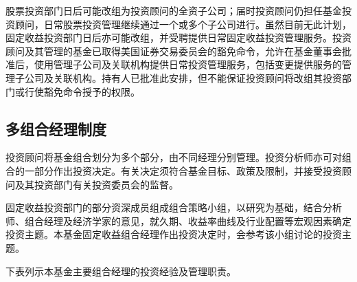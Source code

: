 \documentclass[UTF8,fontset=none,11pt,a4paper]{ctexart}
\begin{document}
股票投资部门日后可能改组为投资顾问的全资子公司；届时投资顾问仍担任基金投资顾问，日常股票投资管理继续通过一个或多个子公司进行。虽然目前无此计划，固定收益投资部门日后亦可能改组，并受聘提供日常固定收益投资管理服务。投资顾问及其管理的基金已取得美国证券交易委员会的豁免命令，允许在基金董事会批准后，使用管理子公司及关联机构提供日常投资管理服务，包括变更提供服务的管理子公司及关联机构。持有人已批准此安排，但不能保证投资顾问将改组其投资部门或行使豁免命令授\allowbreak\mbox{予的权限。}


\subsection*{多组合经理制度}
投资顾问将基金组合划分为多个部分，由不同经理分别管理。投资分析师亦可对组合的一部分作出投资决定。有关决定须符合基金目标、政策及限制，并接受投资顾问及其投资部门有关投资委员\allowbreak\mbox{会的监督。}


固定收益投资部门的部分资深成员组成组合策略小组，以研究为基础，结合分析师、组合经理及经济学家的意见，就久期、收益率曲线及行业配置等宏观因素确定投资主题。本基金固定收益组合经理作出投资决定时，会参考该小组讨论的\allowbreak\mbox{投资主题。}


下表列示本基金主要组合经理的投资经验及\allowbreak\mbox{管理职责。}
\end{document}
